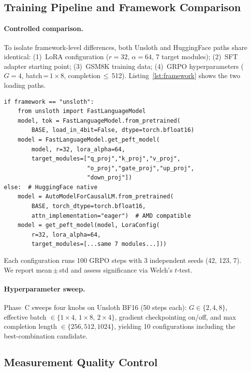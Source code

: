 \subsection{Training Pipeline and Framework Comparison}
\label{sec:pipeline}

\paragraph{Controlled comparison.} To isolate framework-level differences, both Unsloth and HuggingFace paths share identical: (1)~LoRA configuration ($r\!=\!32$, $\alpha\!=\!64$, 7 target modules); (2)~SFT adapter starting point; (3)~GSM8K training data; (4)~GRPO hyperparameters ($G\!=\!4$, batch\,=\,$1\!\times\!8$, completion\,$\leq$\,512). Listing~\ref{lst:framework} shows the two loading paths.

\begin{lstlisting}[caption={Framework comparison: Unsloth vs.\ HuggingFace loading paths.},label={lst:framework}]
if framework == "unsloth":
    from unsloth import FastLanguageModel
    model, tok = FastLanguageModel.from_pretrained(
        BASE, load_in_4bit=False, dtype=torch.bfloat16)
    model = FastLanguageModel.get_peft_model(
        model, r=32, lora_alpha=64,
        target_modules=["q_proj","k_proj","v_proj",
                        "o_proj","gate_proj","up_proj",
                        "down_proj"])
else:  # HuggingFace native
    model = AutoModelForCausalLM.from_pretrained(
        BASE, torch_dtype=torch.bfloat16,
        attn_implementation="eager")  # AMD compatible
    model = get_peft_model(model, LoraConfig(
        r=32, lora_alpha=64,
        target_modules=[...same 7 modules...]))
\end{lstlisting}

\noindent Each configuration runs 100 GRPO steps with 3 independent seeds (42, 123, 7). We report mean\,$\pm$\,std and assess significance via Welch's $t$-test.

\paragraph{Hyperparameter sweep.} Phase~C sweeps four knobs on Unsloth BF16 (50 steps each): $G \in \{2,4,8\}$, effective batch $\in \{1\!\times\!4,\, 1\!\times\!8,\, 2\!\times\!4\}$, gradient checkpointing on/off, and max completion length $\in \{256, 512, 1024\}$, yielding 10 configurations including the best-combination candidate.

\subsection{Measurement Quality Control}
\label{sec:validity}

